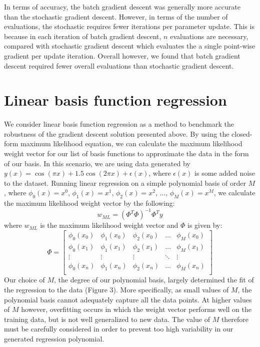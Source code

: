 \documentclass{article}
\begin{document}
In terms of accuracy, the batch gradient descent was generally more accurate than the stochastic gradient descent. However, in terms of the number of evaluations, the stochastic requires fewer iterations per parameter update. This is because in each iteration of batch gradient descent, $n$ evaluations are necessary, compared with stochastic gradient descent which evaluates the a single point-wise gradient per update iteration. Overall however, we found that batch gradient descent required fewer overall evaluations than stochastic gradient descent.

\section{Linear basis function regression}
We consider linear basis function regression as a method to benchmark the robustness of the gradient descent solution presented above. By using the closed-form maximum likelihood equation, we can calculate the maximum likelihood weight vector for our list of basis functions to approximate the data in the form of our basis. In this scenario, we are using data generated by $y(x) = \cos(\pi x) + 1.5 \cos(2 \pi x) + \epsilon(x)$, where $\epsilon(x)$ is some added noise to the dataset. Running linear regression on a simple polynomial basis of order $M$, where $\phi_0(x) = x^0$, $\phi_1(x) = x^1$, $\phi_2(x) = x^2$, ..., $\phi_M(x) = x^M$, we calculate the maximum likelihood weight vector by the following:
$$w_{ML} = (\Phi^T \Phi)^{-1} \Phi^T y$$
where $w_{ML}$ is the maximum likelihood weight vector and $\Phi$ is given by:
$$\Phi =
\begin{bmatrix}
  \phi_0(x_0)   & \phi_1(x_0)   & \phi_2(x_0)   & \dots   & \phi_M(x_0) \\
  \phi_0(x_1)   & \phi_1(x_1)   & \phi_2(x_1)   & \dots   & \phi_M(x_1) \\
  \vdots        & \vdots        & \vdots        & \ddots  & \vdots \\
  \phi_0(x_n)   & \phi_1(x_n)   & \phi_2(x_n)   & \dots   & \phi_M(x_n) \\
\end{bmatrix}
$$
Our choice of $M$, the degree of our polynomial basis, largely determined the fit of the regression to the data (Figure 3). More specifically, as small values of $M$, the polynomial basis cannot adequately capture all the data points. At higher values of $M$ however, overfitting occurs in which the weight vector performs well on the training data, but is not well generalized to new data. The value of $M$ therefore must be carefully considered in order to prevent too high variability in our generated regression polynomial.
\end{document}
